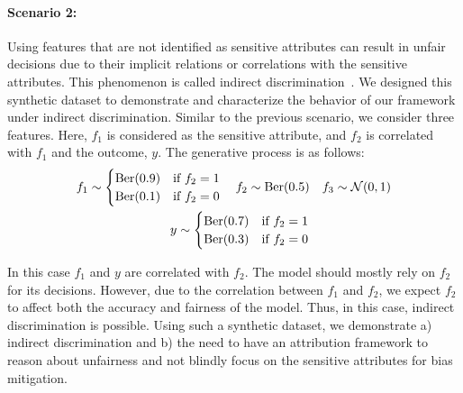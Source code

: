 \paragraph{Scenario 2:} Using features that are not identified as sensitive attributes can result in unfair decisions due to their implicit relations or correlations with the sensitive attributes. This phenomenon is called indirect discrimination~\cite{zliobaite2015survey,6175897,ijcai2017-549}. We designed this synthetic dataset to demonstrate and characterize the behavior of our framework under indirect discrimination. Similar to the previous scenario, we consider three features. Here,  $f_1$ is considered as the sensitive attribute, and $f_2$ is correlated with $f_1$ and the outcome, $y$. The generative process is as follows:
\begin{align*}
    f_1\sim \begin{cases}
        \text{Ber}(0.9) & \text{if } f_2=1\\
        \text{Ber}(0.1) & \text{if } f_2=0
    \end{cases} 
    \quad f_2\sim\text{Ber}(0.5) &
    \quad f_3\sim \mathcal N (0,1) \\ 
    \quad y\sim \begin{cases}
        \text{Ber}(0.7) & \text{if } f_2=1\\ 
        \text{Ber}(0.3) & \text{if } f_2=0
    \end{cases} 
\end{align*}

In this case $f_1$ and $y$ are correlated with 
$f_2$. The model should mostly rely on $f_2$ for its decisions. 
However, due to the correlation between $f_1$ and $f_2$, we expect $f_2$ to affect both the accuracy and fairness of the model. Thus, in this case, indirect discrimination is possible. Using such a synthetic dataset, we demonstrate a) indirect discrimination and b) the need  to have  an attribution framework to reason about unfairness and not blindly focus on the sensitive attributes for bias mitigation.



